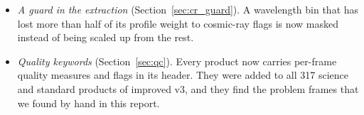 \begin{itemize}
must also stand out from the scatter of the first-pass sky by 5 robust standard deviations. \textit{Result}: in the affected frames the
scatter falls from 3.0--3.3 to 1.1--1.2 times the errors; in normal frames the flux changes by less than 0.2 per cent.
\item \textit{A guard in the extraction} (Section~\ref{sec:cr_guard}). A wavelength bin that has lost more than half
of its profile weight to cosmic-ray flags is now masked instead of being scaled up from the rest.
\item \textit{Quality keywords} (Section~\ref{sec:qc}). Every product now carries per-frame quality measures and flags
in its header. They were added to all 317 science and standard products of improved v3, and they find the problem
frames that we found by hand in this report.
\end{itemize}

